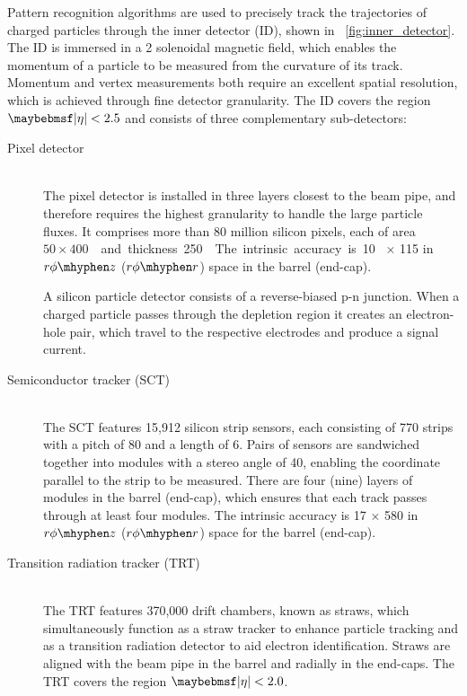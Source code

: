 Pattern recognition algorithms are used to precisely track the trajectories of charged 
particles through the inner detector (ID), shown in \Figure~\ref{fig:inner_detector}. The 
ID is immersed in a \unit{2}{\tesla} solenoidal magnetic field, which enables the 
momentum of a particle to be measured from the curvature of its track. Momentum and 
vertex measurements both require an excellent spatial resolution, which is achieved 
through fine detector granularity. The ID covers the region $\mods{\eta} < 2.5$ and 
consists of three complementary sub-detectors:
\begin{description}
\item[Pixel detector] \hfill \\
	The pixel detector is installed in three layers closest to the beam pipe, and 
	therefore requires the highest granularity to handle the large particle fluxes.
	It comprises more than 80 million silicon pixels, each of area 
	\unit{$50 \times 400$}{\micro\metre\squared} and thickness \unit{250}{\micro\metre}. 
	The intrinsic accuracy is \unit{10}{\micro\metre}$\,\times\,$\unit{115}{\micro\metre} 
	in $r\phi \mhyphen z$ ($r\phi \mhyphen r$) space in the barrel (end-cap).

	A silicon particle detector consists of a reverse-biased p-n junction. When a charged
	particle passes through the depletion region it creates an electron-hole pair, which 
	travel to the respective electrodes and produce a signal current.
\item[Semiconductor tracker (SCT)] \hfill \\
	The SCT features 15,912 silicon strip sensors, each consisting of 770 strips 
	with a pitch of \unit{80}{\micro\metre} and a length of \unit{6}{\centi\metre}. Pairs 
	of sensors are sandwiched together into modules with a stereo angle of 
	\unit{40}{\milli\radian}, enabling the coordinate parallel to the strip to be 
	measured. There are four (nine) layers of modules in the barrel (end-cap), which 
	ensures that each track passes through at least four modules. 
	The intrinsic accuracy is \unit{17}{\micro\metre}$\,\times\,$\unit{580}{\micro\metre} 
	in $r\phi \mhyphen z$ ($r\phi \mhyphen r$) space for the barrel (end-cap).
\item[Transition radiation tracker (TRT)] \hfill \\
	The TRT features 370,000 drift chambers, known as straws, which simultaneously 
	function as a straw tracker to enhance particle tracking and as a transition 
	radiation detector to aid electron identification. Straws are aligned with the beam 
	pipe in the barrel and radially in the end-caps. The TRT covers the region 
	$\mods{\eta} < 2.0$.


\end{description}
